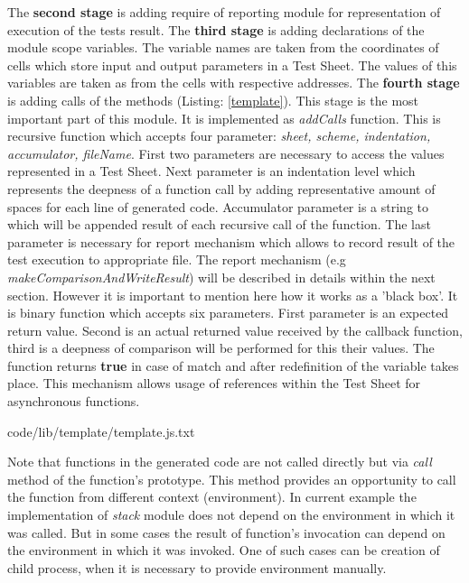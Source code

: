 The \textbf{second stage} is adding require of reporting module for representation of execution of the tests result.
The \textbf{third stage} is adding declarations of the module scope variables. The variable names are taken from the coordinates of cells which store input and output parameters in a Test Sheet. The values of this variables are taken as from the cells with respective addresses.
The \textbf{fourth stage} is adding calls of the methods (Listing: \ref{template}). This stage is the most important part of this module. It is implemented as \textit{addCalls} function. This is recursive function which accepts four parameter: \textit{sheet, scheme, indentation, accumulator, fileName}. First two parameters are necessary to access the values represented in a Test Sheet. Next parameter is an indentation level which represents the deepness of a function call by adding representative amount of spaces for each line of generated code. Accumulator parameter is a string to which will be appended result of each recursive call of the function. The last parameter is necessary for report mechanism which allows to record result of the test execution to appropriate file. The report mechanism (e.g \textit{makeComparisonAndWriteResult}) will be described in details within  the next section. However it is important to mention here how it works as a 'black box'. It is binary function which accepts  six parameters. First parameter is an expected return value. Second is an actual returned value received by the callback function, third is a deepness of comparison will be performed for this their values. The function returns \textbf{true} in case of match and after redefinition of the variable takes place. This mechanism allows usage of references within the Test Sheet for asynchronous functions.

{code/lib/template/template.js.txt}

Note that functions in the generated code are not called directly but via \textit{call} method of the function's prototype. This method provides an opportunity to call the function from different context (environment). In current example the implementation of \textit{stack} module does not depend on the environment in which it was called. But in some cases the result of function's invocation can depend on the environment in which it was invoked. One of such cases can be creation of child process, when it is necessary to provide environment manually. 


